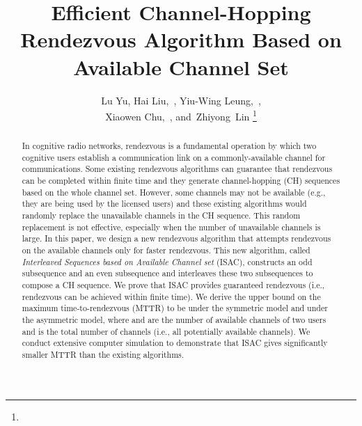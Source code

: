 \documentclass[journal]{IEEEtran}
\begin{document}
\title{Efficient Channel-Hopping Rendezvous Algorithm Based on Available Channel Set}


\author{Lu Yu, Hai Liu,~, Yiu-Wing Leung,~, \\Xiaowen Chu,~, and~Zhiyong~Lin
\thanks{}}


\maketitle


\begin{abstract}
In cognitive radio networks, rendezvous is a fundamental operation by which two cognitive users establish a communication link on a commonly-available channel for communications. Some existing rendezvous algorithms can guarantee that rendezvous can be completed within finite time and they generate channel-hopping (CH) sequences based on the whole channel set. However, some channels may not be available (e.g., they are being used by the licensed users) and these existing algorithms would randomly replace the unavailable channels in the CH sequence. This random replacement is not effective, especially when the number of unavailable channels is large. In this paper, we design a new rendezvous algorithm that attempts rendezvous on the available channels only for faster rendezvous. This new algorithm, called \emph{Interleaved Sequences based on Available Channel set} (ISAC), constructs an odd subsequence and an even subsequence and interleaves these two subsequences to compose a CH sequence. We prove that ISAC provides guaranteed rendezvous (i.e., rendezvous can be achieved within finite time). We derive the upper bound on the maximum time-to-rendezvous (MTTR) to be   under the symmetric model and   under the asymmetric model, where  and  are the number of available channels of two users and   is the total number of channels (i.e., all potentially available channels). We conduct extensive computer simulation to demonstrate that ISAC gives significantly smaller MTTR than the existing algorithms.
\end{abstract}
\end{document}
